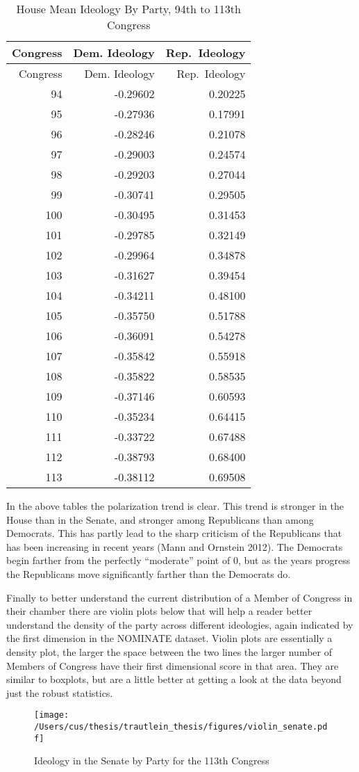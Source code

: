 \documentclass[12pt,twoside]{reedthesis}
\begin{document}
  \begin{longtable}[c]{@{}rrr@{}}
  \caption{House Mean Ideology By Party, 94th to 113th
  Congress}\tabularnewline
  \toprule
  Congress & Dem. Ideology & Rep.~Ideology\tabularnewline
  \midrule
  \endfirsthead
  \toprule
  Congress & Dem. Ideology & Rep.~Ideology\tabularnewline
  \midrule
  \endhead
  94 & -0.29602 & 0.20225\tabularnewline
  95 & -0.27936 & 0.17991\tabularnewline
  96 & -0.28246 & 0.21078\tabularnewline
  97 & -0.29003 & 0.24574\tabularnewline
  98 & -0.29203 & 0.27044\tabularnewline
  99 & -0.30741 & 0.29505\tabularnewline
  100 & -0.30495 & 0.31453\tabularnewline
  101 & -0.29785 & 0.32149\tabularnewline
  102 & -0.29964 & 0.34878\tabularnewline
  103 & -0.31627 & 0.39454\tabularnewline
  104 & -0.34211 & 0.48100\tabularnewline
  105 & -0.35750 & 0.51788\tabularnewline
  106 & -0.36091 & 0.54278\tabularnewline
  107 & -0.35842 & 0.55918\tabularnewline
  108 & -0.35822 & 0.58535\tabularnewline
  109 & -0.37146 & 0.60593\tabularnewline
  110 & -0.35234 & 0.64415\tabularnewline
  111 & -0.33722 & 0.67488\tabularnewline
  112 & -0.38793 & 0.68400\tabularnewline
  113 & -0.38112 & 0.69508\tabularnewline
  \bottomrule
  \end{longtable}
  
  In the above tables the polarization trend is clear. This trend is
  stronger in the House than in the Senate, and stronger among Republicans
  than among Democrats. This has partly lead to the sharp criticism of the
  Republicans that has been increasing in recent years (Mann and Ornstein
  2012). The Democrats begin farther from the perfectly ``moderate'' point
  of 0, but as the years progress the Republicans move significantly
  farther than the Democrats do.
  
  Finally to better understand the current distribution of a Member of
  Congress in their chamber there are violin plots below that will help a
  reader better understand the density of the party across different
  ideologies, again indicated by the first dimension in the NOMINATE
  dataset. Violin plots are essentially a density plot, the larger the
  space between the two lines the larger number of Members of Congress
  have their first dimensional score in that area. They are similar to
  boxplots, but are a little better at getting a look at the data beyond
  just the robust statistics.
  
  \begin{figure}[h!tbp]
  \centering
  \texttt{[image: /Users/cus/thesis/trautlein\_thesis/figures/violin\_senate.pdf]}
  \caption[Ideology in the Senate by Party for the 113th Congress]{\normalsize{Ideology in the Senate by Party for the 113th Congress}}
  \label{fig:def}
  \end{figure}
  
\end{document}
